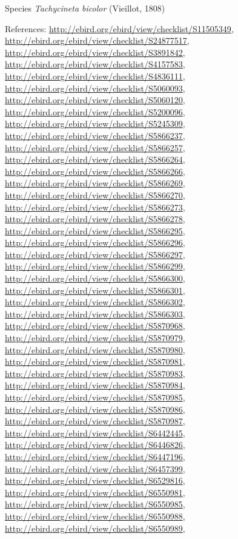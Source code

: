 \documentclass[9pt, article]{memoir}
\begin{document}
\begin{multicols}{2}
\vspace{6pt}\noindent\hspace{36pt}Species \textit{Tachycineta bicolor} (Vieillot, 1808)


\vspace{6pt}References: 
\url{http://ebird.org/ebird/view/checklist/S11505349}, 
\url{http://ebird.org/ebird/view/checklist/S24877517}, 
\url{http://ebird.org/ebird/view/checklist/S3891842}, 
\url{http://ebird.org/ebird/view/checklist/S4157583}, 
\url{http://ebird.org/ebird/view/checklist/S4836111}, 
\url{http://ebird.org/ebird/view/checklist/S5060093}, 
\url{http://ebird.org/ebird/view/checklist/S5060120}, 
\url{http://ebird.org/ebird/view/checklist/S5200096}, 
\url{http://ebird.org/ebird/view/checklist/S5245309}, 
\url{http://ebird.org/ebird/view/checklist/S5866237}, 
\url{http://ebird.org/ebird/view/checklist/S5866257}, 
\url{http://ebird.org/ebird/view/checklist/S5866264}, 
\url{http://ebird.org/ebird/view/checklist/S5866266}, 
\url{http://ebird.org/ebird/view/checklist/S5866269}, 
\url{http://ebird.org/ebird/view/checklist/S5866270}, 
\url{http://ebird.org/ebird/view/checklist/S5866273}, 
\url{http://ebird.org/ebird/view/checklist/S5866278}, 
\url{http://ebird.org/ebird/view/checklist/S5866295}, 
\url{http://ebird.org/ebird/view/checklist/S5866296}, 
\url{http://ebird.org/ebird/view/checklist/S5866297}, 
\url{http://ebird.org/ebird/view/checklist/S5866299}, 
\url{http://ebird.org/ebird/view/checklist/S5866300}, 
\url{http://ebird.org/ebird/view/checklist/S5866301}, 
\url{http://ebird.org/ebird/view/checklist/S5866302}, 
\url{http://ebird.org/ebird/view/checklist/S5866303}, 
\url{http://ebird.org/ebird/view/checklist/S5870968}, 
\url{http://ebird.org/ebird/view/checklist/S5870979}, 
\url{http://ebird.org/ebird/view/checklist/S5870980}, 
\url{http://ebird.org/ebird/view/checklist/S5870981}, 
\url{http://ebird.org/ebird/view/checklist/S5870983}, 
\url{http://ebird.org/ebird/view/checklist/S5870984}, 
\url{http://ebird.org/ebird/view/checklist/S5870985}, 
\url{http://ebird.org/ebird/view/checklist/S5870986}, 
\url{http://ebird.org/ebird/view/checklist/S5870987}, 
\url{http://ebird.org/ebird/view/checklist/S6442445}, 
\url{http://ebird.org/ebird/view/checklist/S6446826}, 
\url{http://ebird.org/ebird/view/checklist/S6447196}, 
\url{http://ebird.org/ebird/view/checklist/S6457399}, 
\url{http://ebird.org/ebird/view/checklist/S6529816}, 
\url{http://ebird.org/ebird/view/checklist/S6550981}, 
\url{http://ebird.org/ebird/view/checklist/S6550985}, 
\url{http://ebird.org/ebird/view/checklist/S6550988}, 
\url{http://ebird.org/ebird/view/checklist/S6550989}, 

\end{multicols}
\end{document}
